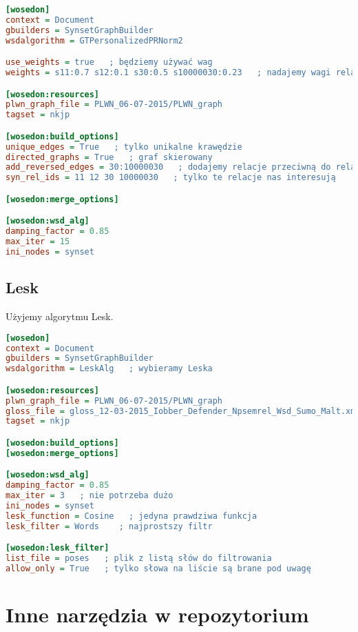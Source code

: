 \documentclass[10pt,a4paper]{article}
\begin{document}
\begin{lstlisting}[language=Ini]
[wosedon]
context = Document
gbuilders = SynsetGraphBuilder 
wsdalgorithm = GTPersonalizedPRNorm2

use_weights = true   ; będziemy używać wag
weights = s11:0.7 s12:0.1 s30:0.5 s10000030:0.23   ; nadajemy wagi relacjom

[wosedon:resources]
plwn_graph_file = PLWN_06-07-2015/PLWN_graph
tagset = nkjp

[wosedon:build_options]
unique_edges = True   ; tylko unikalne krawędzie
directed_graphs = True   ; graf skierowany
add_reversed_edges = 30:10000030   ; dodajemy relacje przeciwną do relacji '30'
syn_rel_ids = 11 12 30 10000030   ; tylko te relacje nas interesują

[wosedon:merge_options]

[wosedon:wsd_alg]
damping_factor = 0.85
max_iter = 15
ini_nodes = synset

\end{lstlisting}

\subsection{Lesk}
Użyjemy algorytmu Lesk.

\begin{lstlisting}[language=Ini]
[wosedon]
context = Document
gbuilders = SynsetGraphBuilder
wsdalgorithm = LeskAlg   ; wybieramy Leska

[wosedon:resources]
plwn_graph_file = PLWN_06-07-2015/PLWN_graph
gloss_file = gloss_12-03-2015_Iobber_Defender_Npsemrel_Wsd_Sumo_Malt.xml   ; potrzebny jest plik z definicjami dla synsetów
tagset = nkjp

[wosedon:build_options]
[wosedon:merge_options]

[wosedon:wsd_alg]
damping_factor = 0.85
max_iter = 3   ; nie potrzeba dużo
ini_nodes = synset
lesk_function = Cosine   ; jedyna prawdziwa funkcja
lesk_filter = Words    ; najprostszy filtr

[wosedon:lesk_filter]
list_file = poses   ; plik z listą słów do filtrowania
allow_only = True   ; tylko słowa na liście są brane pod uwagę
\end{lstlisting}



\section{Inne narzędzia w repozytorium}
\end{document}
